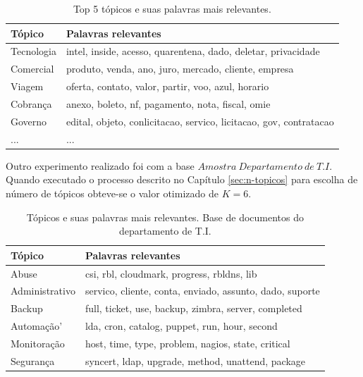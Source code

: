 \documentclass[12pt,a4paper]{article}
\begin{document}
\begin{table}[H]
  \centering
  \begin{tabular}{ll}
  Tópico                   & Palavras relevantes \\
  \hline
  Tecnologia               & intel, inside, acesso, quarentena, dado, deletar, privacidade \\
  Comercial                & produto, venda, ano, juro, mercado, cliente, empresa \\
  Viagem                   & oferta, contato, valor, partir, voo, azul, horario \\
  Cobrança                 & anexo, boleto, nf, pagamento, nota, fiscal, omie \\
  Governo                  & edital, objeto, conlicitacao, servico, licitacao, gov, contratacao \\
  ...                        & ... \\
  \hline
  \end{tabular}
  \caption{Top 5 tópicos e suas palavras mais relevantes.}
  \label{tab-global-topics}
\end{table}


Outro experimento realizado foi com a base $Amostra\ Departamento\ de\ T.I$. Quando executado o processo descrito no Capítulo \ref{sec:n-topicos} para escolha de número de tópicos obteve-se o valor otimizado de $K=6$.

\begin{table}[H]
  \centering
  \begin{tabular}{ll}
  Tópico                   & Palavras relevantes \\
  \hline
  Abuse                    & csi, rbl, cloudmark, progress, rbldns, lib \\
  Administrativo           & servico, cliente, conta, enviado, assunto, dado, suporte \\
  Backup                   & full, ticket, use, backup, zimbra, server, completed  \\
  Automação'                & lda, cron, catalog, puppet, run, hour, second \\
  Monitoração              & host, time, type, problem, nagios, state, critical \\
  Segurança                & syncert, ldap, upgrade, method, unattend, package \\
  \hline
  \end{tabular}
  \caption{Tópicos e suas palavras mais relevantes. Base de documentos do departamento de T.I.}
  \label{tab-nich-topics}
\end{table}
\end{document}
